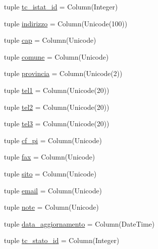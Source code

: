 \begin{DoxyCompactItemize}
\item 
tuple \hyperlink{classmmasgis_1_1mysql__sqlalchemy__class_1_1Pv_a8e70581cf222fdd20093e56cb85d3891}{tc\_\-istat\_\-id} = Column(Integer)
\item 
tuple \hyperlink{classmmasgis_1_1mysql__sqlalchemy__class_1_1Pv_a05857055cd2ca17aa9301378e01a0972}{indirizzo} = Column(Unicode(100))
\item 
tuple \hyperlink{classmmasgis_1_1mysql__sqlalchemy__class_1_1Pv_ac76c2097274d83886bb780e01bea8442}{cap} = Column(Unicode)
\item 
tuple \hyperlink{classmmasgis_1_1mysql__sqlalchemy__class_1_1Pv_a764c5f445960b6701e1229398fb381d3}{comune} = Column(Unicode)
\item 
tuple \hyperlink{classmmasgis_1_1mysql__sqlalchemy__class_1_1Pv_aaf8ae70e686d9e89d2621538f25a1092}{provincia} = Column(Unicode(2))
\item 
tuple \hyperlink{classmmasgis_1_1mysql__sqlalchemy__class_1_1Pv_ad9a9351c352abf2b8a07dcde54f37408}{tel1} = Column(Unicode(20))
\item 
tuple \hyperlink{classmmasgis_1_1mysql__sqlalchemy__class_1_1Pv_a2a35d685cb25847cad8db9eb6f44b7ca}{tel2} = Column(Unicode(20))
\item 
tuple \hyperlink{classmmasgis_1_1mysql__sqlalchemy__class_1_1Pv_a5ae160c55afaa0fd0370deb7aabeb332}{tel3} = Column(Unicode(20))
\item 
tuple \hyperlink{classmmasgis_1_1mysql__sqlalchemy__class_1_1Pv_aa2f3ca9873cfa4c5e57ef4ebc0392f85}{cf\_\-pi} = Column(Unicode)
\item 
tuple \hyperlink{classmmasgis_1_1mysql__sqlalchemy__class_1_1Pv_a4d6caac4762ddec2bb903f9b6d605986}{fax} = Column(Unicode)
\item 
tuple \hyperlink{classmmasgis_1_1mysql__sqlalchemy__class_1_1Pv_a67e469a7f2cda59394890c116bbc8450}{sito} = Column(Unicode)
\item 
tuple \hyperlink{classmmasgis_1_1mysql__sqlalchemy__class_1_1Pv_ab639489c7a3c20b8c912aa596cf57feb}{email} = Column(Unicode)
\item 
tuple \hyperlink{classmmasgis_1_1mysql__sqlalchemy__class_1_1Pv_acb5fbb6c7616e39e0f29d24f2584210a}{note} = Column(Unicode)
\item 
tuple \hyperlink{classmmasgis_1_1mysql__sqlalchemy__class_1_1Pv_a525b48c4651a92b0a114689b7d9744bc}{data\_\-aggiornamento} = Column(DateTime)
\item 
tuple \hyperlink{classmmasgis_1_1mysql__sqlalchemy__class_1_1Pv_a4ea13738df24a3f92a1957094f07fa57}{tc\_\-stato\_\-id} = Column(Integer)

\end{DoxyCompactItemize}
